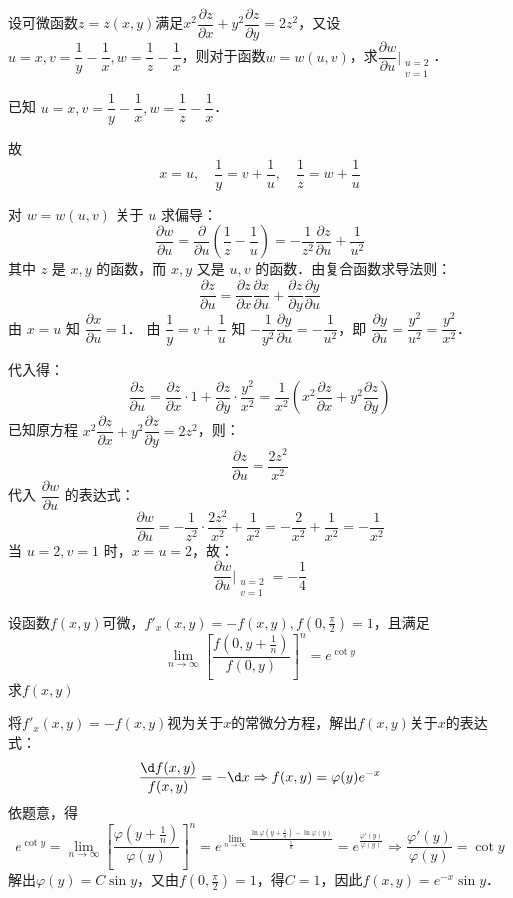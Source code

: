 \documentclass[12pt, a4paper, oneside, UTF8]{ctexbook}
\begin{document}
\begin{example}
    设可微函数$z=z(x,y)$满足$x^2\dfrac{\partial z}{\partial x}+y^2\dfrac{\partial z}{\partial y}=2z^2$，又设$u=x,v=\dfrac{1}{y}-\dfrac{1}{x},w=\dfrac{1}{z}-\dfrac{1}{x}$，则对于函数$w=w(u,v)$，求$\dfrac{\partial w}{\partial u}\Big|_{\substack{u=2\\v=1}}$．
\end{example}
\begin{solution}
    已知 $u=x, v = \dfrac{1}{y} - \dfrac{1}{x}, w = \dfrac{1}{z} - \dfrac{1}{x}$．
    
    故$$x=u,\quad\dfrac{1}{y} = v + \dfrac{1}{u},\quad\dfrac{1}{z} = w + \dfrac{1}{u}$$
    
    对 $w=w(u,v)$ 关于 $u$ 求偏导：
    \[ \frac{\partial w}{\partial u} = \frac{\partial}{\partial u} \left( \frac{1}{z} - \frac{1}{u} \right) = -\frac{1}{z^2} \frac{\partial z}{\partial u} + \frac{1}{u^2} \]
    其中 $z$ 是 $x, y$ 的函数，而 $x, y$ 又是 $u, v$ 的函数．由复合函数求导法则：
    \[ \frac{\partial z}{\partial u} = \frac{\partial z}{\partial x} \frac{\partial x}{\partial u} + \frac{\partial z}{\partial y} \frac{\partial y}{\partial u} \]
    由 $x=u$ 知 $\dfrac{\partial x}{\partial u} = 1$．
    由 $\dfrac{1}{y} = v + \dfrac{1}{u}$ 知 $-\dfrac{1}{y^2} \dfrac{\partial y}{\partial u} = -\dfrac{1}{u^2}$，即 $\dfrac{\partial y}{\partial u} = \dfrac{y^2}{u^2} = \dfrac{y^2}{x^2}$．
    
        代入得：
    \[ \frac{\partial z}{\partial u} = \frac{\partial z}{\partial x} \cdot 1 + \frac{\partial z}{\partial y} \cdot \frac{y^2}{x^2} = \frac{1}{x^2} \left( x^2 \frac{\partial z}{\partial x} + y^2 \frac{\partial z}{\partial y} \right) \]
    已知原方程 $x^2 \dfrac{\partial z}{\partial x} + y^2 \dfrac{\partial z}{\partial y} = 2z^2$，则：
    \[ \frac{\partial z}{\partial u} = \frac{2z^2}{x^2} \]
    代入 $\dfrac{\partial w}{\partial u}$ 的表达式：
    \[ \frac{\partial w}{\partial u} = -\frac{1}{z^2} \cdot \frac{2z^2}{x^2} + \frac{1}{x^2} = -\frac{2}{x^2} + \frac{1}{x^2} = -\frac{1}{x^2} \]
    当 $u=2, v=1$ 时，$x=u=2$，故：
    \[ \boxed{\frac{\partial w}{\partial u}\Big|_{\substack{u=2\\v=1}} = -\frac{1}{4}} \]
\end{solution}

\begin{example}
    设函数$f(x,y)$可微，$f'_x(x,y)=-f(x,y),f(0,\frac{\pi}{2})=1$，且满足\[\lim_{n\to\infty}\left[\frac{f(0,y+\frac{1}{n})}{f(0,y)}\right]^n = e^{\cot y}\]求$f(x,y)$
\end{example}
\begin{solution}
    将$f'_x(x,y)=-f(x,y)$视为关于$x$的常微分方程，解出$f(x,y)$关于$x$的表达式：
    \[\frac{\d f(x,y)}{f(x,y)}= -\d x\Rightarrow f(x,y) = \varphi(y)e^{-x}\]
    依题意，得
    \[e^{\cot y} = \lim_{n\to\infty}\left[\frac{\varphi(y+\frac{1}{n})}{\varphi(y)}\right]^n =e^{\displaystyle\lim_{n\to\infty} \frac{\ln \varphi({y+\frac{1}{n}})-\ln \varphi(y)}{\frac{1}{n}}}= e^{\frac{\varphi'(y)}{\varphi(y)}}\Rightarrow \frac{\varphi'(y)}{\varphi(y)} = \cot y\]
    解出$\varphi(y) = C\sin y$，又由$f(0,\frac{\pi}{2})=1$，得$C=1$，因此$\boxed{f(x,y) = e^{-x}\sin y}$．
\end{solution}
\end{document}
